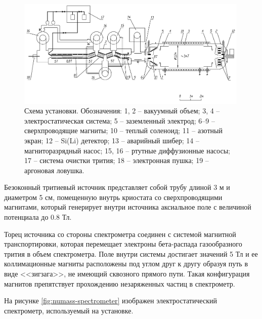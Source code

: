 \documentclass[a4paper,14pt]{extreport}
\begin{document}
\begin{figure}
  \centering
  \includegraphics[width = 0.99\textwidth]{img/nu_mass_setup/general.png}
    \caption{Схема установки. Обозначения: 1, 2 – вакуумный объем; 3, 4 – электростатическая система; 5 – заземленный электрод; 6–9 – сверхпроводящие магниты; 10 – теплый соленоид; 11 – азотный экран; 12 – Si(Li) детектор; 13 – аварийный шибер; 14 – магниторазрядный насос; 15, 16 – ртутные диффузионные насосы; 17 – система очистки трития; 18 – электронная пушка; 19 – аргоновая ловушка.}
    \label{fig:numass-general}
\end{figure}

Безоконный тритиевый источник представляет собой трубу длиной 3 м и диаметром 5 см, помещенную внутрь криостата со сверхпроводящими магнитами, который генерирует внутри источника аксиальное поле с величиной потенциала до 0.8 Тл.

Торец источника со стороны спектрометра соединен с системой магнитной транспортировки, которая перемещает электроны бета-распада газообразного трития в объем спектрометра. Поле внутри системы достигает значений 5 Тл и ее коллимационные магниты расположены под углом друг к другу образуя путь в виде <<зигзага>>, не имеющий сквозного прямого пути. Такая конфигурация магнитов препятствует прохождению незаряженных частиц в спектрометр.

На рисунке \ref{fig:numass-spectrometer} изображен электростатический спектрометр, используемый на установке.
\end{document}
